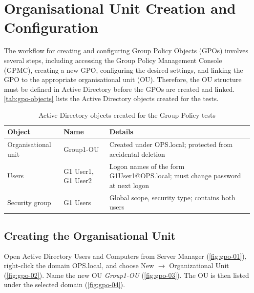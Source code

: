 \section{Organisational Unit Creation and Configuration}
\label{sec:gpo-ou}
The workflow for creating and configuring Group Policy Objects (GPOs) involves several steps, including accessing the Group Policy Management Console (GPMC), creating a new GPO, configuring the desired settings, and linking the GPO to the appropriate organisational unit (OU). Therefore, the OU structure must be defined in Active Directory before the GPOs are created and linked. \autoref{tab:gpo-objects} lists the Active Directory objects created for the tests.

\begin{table}[H]
  \centering
  \small\sffamily
  \renewcommand{\arraystretch}{1.3}
  \begin{tabular}{@{}p{3.4cm}p{4.4cm}p{6.3cm}@{}}
    \toprule
    \textbf{Object} & \textbf{Name} & \textbf{Details} \\
    \midrule
    Organisational unit & Group1-OU & Created under OPS.local; protected from accidental deletion \\
    Users & G1 User1, G1 User2 & Logon names of the form G1User1@OPS.local; must change password at next logon \\
    Security group & G1 Users & Global scope, security type; contains both users \\
    \bottomrule
  \end{tabular}
  \caption{Active Directory objects created for the Group Policy tests}\label{tab:gpo-objects}
\end{table}

\subsection{Creating the Organisational Unit}
\label{sec:gpo-create-ou}
Open Active Directory Users and Computers from Server Manager (\autoref{fig:gpo-01}), right-click the domain OPS.local, and choose New $\rightarrow$ Organizational Unit (\autoref{fig:gpo-02}). Name the new OU \emph{Group1-OU} (\autoref{fig:gpo-03}). The OU is then listed under the selected domain (\autoref{fig:gpo-04}).


